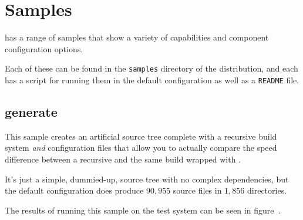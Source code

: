 %
%
%
%
\chapter{Samples}\label{chap:samples}

\lmsbw has a range of samples that show a variety of capabilities and
component configuration options.

Each of these can be found in the \texttt{samples} directory of the
\lmsbw distribution, and each has a script for running them in the
default configuration as well as a \texttt{README} file.


\section{generate}\label{samples:generate}

This sample creates an artificial source tree complete with a
recursive \make build system \emph{and} \lmsbw configuration files
that allow you to actually compare the speed difference between a
recursive \make and the same build wrapped with \lmsbw.

It's just a simple, dummied-up, source tree with no complex
dependencies, but the default configuration does produce $90,955$ source
files in $1,856$ directories.

The results of running this sample on the test system can be seen in
figure~.


